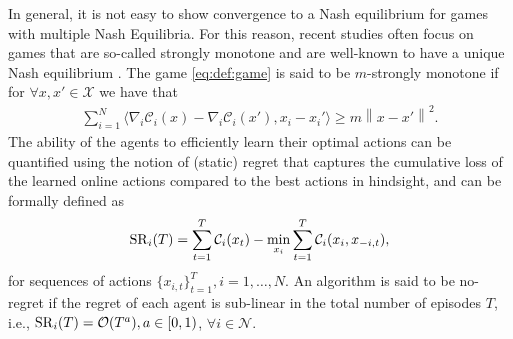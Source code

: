 

In general, it is not easy to show convergence to a Nash equilibrium for games with multiple Nash Equilibria. 
%
For this reason, recent studies often focus on games that are so-called strongly monotone and are well-known to have a unique Nash equilibrium \cite{rosen1965existence}. 
%
The game \eqref{eq:def:game} is said to be $m$-strongly monotone if for $\forall x,x'\in \mathcal{X}$ we have that 
\begin{align}\label{eq:strong_monotone}
    \sum_{i=1}^N \langle \nabla_i \mathcal{C}_i(x) -\nabla_i \mathcal{C}_i(x'),x_i-x_i' \rangle \geq m \left\|x -x' \right\|^2.
\end{align}
%
The ability of the agents to efficiently learn their optimal actions can be quantified using the notion of (static) regret that captures the cumulative loss of the learned online actions compared to the best actions in hindsight, and can be formally defined as
\begin{align}\label{eq:def:regret:game}
    {\rm{SR}}_i(T)= \sum_{t=1}^T \mathcal{C}_i(x_t) - \mathop{\rm{min}}_{x_i} \sum_{t=1}^T\mathcal{C}_i(x_i,x_{-i,t}),
\end{align}
for sequences of actions $\{x_{i,t} \}_{t=1}^T, i=1,\ldots,N$.
An algorithm is said to be no-regret if the regret of each agent is sub-linear in the total number of episodes $T$, i.e., ${\rm{SR}}_i(T)=\mathcal{O}(T^a), a\in[0,1)$, $\forall i \in \mathcal{N}$.


